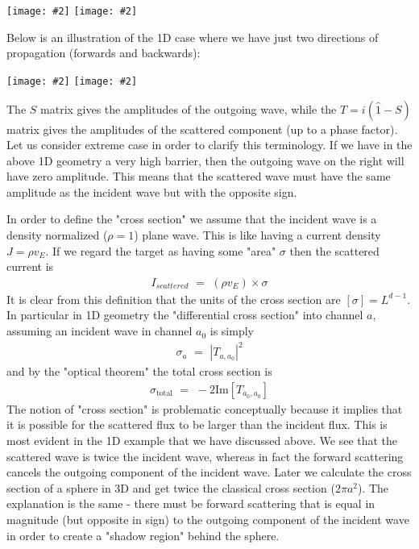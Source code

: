 \documentclass[onecolumn,fleqn, 11pt]{revtex4}
\newcommand{\im}{\mathrm{Im}}
\newcommand{\tbox}[1]{\text{#1}}
\newcommand{\putgraph}[2][0.30\hsize]{\texttt{[image: \#2]}}
\newcommand{\beq}{\begin{eqnarray}}
\newcommand{\eeq}{\end{eqnarray}}
\begin{document}
\begin{center}
\putgraph[0.3\hsize]{ScatteringIngoingOutgoing} 
\hspace{0.1\hsize}
\putgraph[0.4\hsize]{ScatteringIncidentScattered}
\end{center}

Below is an illustration of the 1D case 
where we have just two directions of propagation 
(forwards and backwards):

\begin{center}
\putgraph[0.45\hsize]{ScatteringBarrier2} 
\hspace{0.05\hsize}
\putgraph[0.45\hsize]{ScatteringBarrier1}
\end{center}


The $S$ matrix gives the amplitudes  
of the outgoing wave, while the $T = i(\hat{1}-S)$ 
matrix gives the amplitudes of the 
scattered component (up to a phase factor).
Let us consider extreme case in order to clarify 
this terminology. If we have in the above 1D geometry 
a very high barrier, then the outgoing wave on the right 
will have zero amplitude.  This means that 
the scattered wave must have the same 
amplitude as the incident wave but with 
the opposite sign.


In order to define the "cross section" we assume that 
the incident wave is a density normalized ($\rho=1$) 
plane wave. This is like having a current density 
$J=\rho v_E$. If we regard the target as having 
some "area" $\sigma$ then the scattered current is 
\beq
I_{scattered} \,\, =  \,\,  (\rho v_E) \times \sigma 
\eeq
It is clear from this definition that the units 
of the cross section are $[\sigma]=L^{d-1}$. 
In particular in 1D geometry the "differential 
cross section" into channel $a$, assuming an incident 
wave in channel $a_0$ is simply 
\beq
\sigma_a \,\, =  \,\,  |T_{a,a_0}|^2 
\eeq
and by the "optical theorem" the total cross section is 
\beq
\sigma_{\tbox{total}} \,\, =  \,\,  -2\im[T_{a_0,a_0}]
\eeq
The notion of "cross section" is problematic 
conceptually because it implies that it is possible for 
the scattered flux to be larger than 
the incident flux. This is most evident in the 1D 
example that we have discussed above. We see that the 
scattered wave is twice the incident wave,  
whereas in fact the forward scattering cancels the 
outgoing component of the incident wave. 
Later we calculate the cross section of a sphere 
in 3D and get twice the classical cross section ($2\pi a^2$). 
The explanation is the same - there must be 
forward scattering that is equal in magnitude 
(but opposite in sign) to the outgoing component 
of the incident wave in order to create a "shadow region" 
behind the sphere. 
\end{document}
